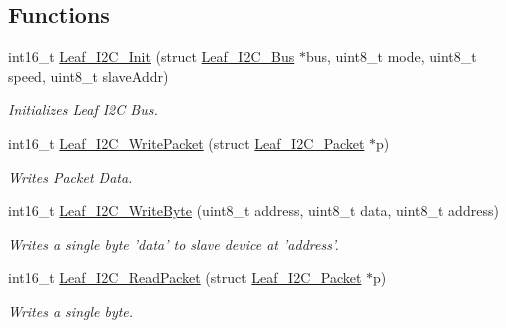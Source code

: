 \subsection*{Functions}
\begin{DoxyCompactItemize}
\item 
int16\-\_\-t \hyperlink{leaf-i2c_8h_a8baf85c610de76ab3ce759b088191f19}{Leaf\-\_\-\-I2\-C\-\_\-\-Init} (struct \hyperlink{structLeaf__I2C__Bus}{Leaf\-\_\-\-I2\-C\-\_\-\-Bus} $\ast$bus, uint8\-\_\-t mode, uint8\-\_\-t speed, uint8\-\_\-t slave\-Addr)
\begin{DoxyCompactList}\small\item\em Initializes Leaf I2\-C Bus. \end{DoxyCompactList}\item 
int16\-\_\-t \hyperlink{leaf-i2c_8h_acb87a8d98a75a29347893b452aca9ef4}{Leaf\-\_\-\-I2\-C\-\_\-\-Write\-Packet} (struct \hyperlink{structLeaf__I2C__Packet}{Leaf\-\_\-\-I2\-C\-\_\-\-Packet} $\ast$p)
\begin{DoxyCompactList}\small\item\em Writes Packet Data. \end{DoxyCompactList}\item 
int16\-\_\-t \hyperlink{leaf-i2c_8h_a42a711e1b77b245413e85d9ee7c3a00a}{Leaf\-\_\-\-I2\-C\-\_\-\-Write\-Byte} (uint8\-\_\-t address, uint8\-\_\-t data, uint8\-\_\-t address)
\begin{DoxyCompactList}\small\item\em Writes a single byte 'data' to slave device at 'address'. \end{DoxyCompactList}\item 
int16\-\_\-t \hyperlink{leaf-i2c_8h_a6ad51ae1b223a9675eeae97be32bc967}{Leaf\-\_\-\-I2\-C\-\_\-\-Read\-Packet} (struct \hyperlink{structLeaf__I2C__Packet}{Leaf\-\_\-\-I2\-C\-\_\-\-Packet} $\ast$p)
\begin{DoxyCompactList}\small\item\em Writes a single byte. \end{DoxyCompactList}\end{DoxyCompactItemize}


